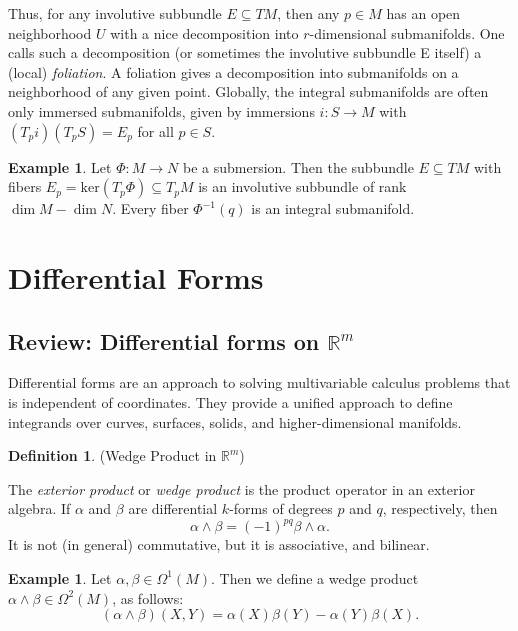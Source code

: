 \documentclass{article}
\theoremstyle{definition}
\newtheorem{defn}[theorem]{Definition}
\newtheorem{example}[theorem]{Example}
\newenvironment{definition}
  {\vspace{8pt}\begin{mdframed}[backgroundcolor=blueish,innertopmargin=4]\begin{defn}}
  {\end{defn}\end{mdframed}\vspace{4pt}}
\begin{document}
Thus, for any involutive subbundle $E \subseteq TM$, then any $p \in M$ has an open neighborhood $U$ with a nice decomposition into $r$-dimensional submanifolds. One calls such a decomposition (or sometimes the involutive subbundle E itself) a (local) \textit{foliation}. A foliation gives a decomposition into submanifolds on a neighborhood of any given point. Globally, the integral submanifolds are often only immersed submanifolds, given by immersions $i : S \rightarrow M$ with $(T_pi)(T_pS) = E_p$ for
all $p \in S$.

\begin{example}
Let $\Phi : M \rightarrow N$ be a submersion. Then the subbundle $E \subseteq TM$ with fibers $E_p = \text{ker}(T_p \Phi) \subseteq T_pM$ is an involutive subbundle of rank $\dim M - \dim N$. Every fiber $\Phi^{-1}(q)$ is an integral submanifold.
\end{example}


\newpage
\section{Differential Forms}



\subsection{Review: Differential forms on \texorpdfstring{$\mathbb R^m$}{Rm}}

Differential forms are an approach to solving multivariable calculus problems that is independent of coordinates. They provide a unified approach to define integrands over curves, surfaces, solids, and higher-dimensional manifolds.

\begin{definition} (Wedge Product in $\mathbb R^m$)

The \textit{exterior product} or \textit{wedge product} is the product operator in an exterior algebra. If $\alpha$ and $\beta$ are differential $k$-forms of degrees $p$ and $q$, respectively, then
\[
    \alpha \wedge \beta=(-1)^{pq} \beta \wedge \alpha. 	
\]
It is not (in general) commutative, but it is associative, and bilinear. 

\end{definition}
\begin{example}
Let $\alpha, \beta \in \Omega^1(M)$. Then we define a wedge product $\alpha \wedge \beta \in \Omega^2 (M)$, as follows:
\[
    (\alpha \wedge \beta)(X,Y) = \alpha (X)\beta(Y)-\alpha(Y)\beta(X).
\]
\end{example}
\end{document}
